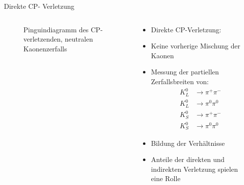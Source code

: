 \documentclass[aspectratio=1610, professionalfonts, 9pt, t]{beamer}
\begin{document}
\begin{frame}{Direkte CP- Verletzung}
\begin{columns}[onlytextwidth]
\begin{column}{0.4\textwidth}
\begin{figure}[ht]
          \caption{Pinguindiagramm des CP-verletzenden, neutralen Kaonenzerfalls}
        \end{figure}
      \end{column}
      \begin{column}{0.5\textwidth}
        \begin{itemize}
          \item Direkte CP-Verletzung:
          \item[\rightarrow] Keine vorherige Mischung der Kaonen
          \item Messung der partiellen Zerfallsbreiten von:
          \begin{align*}
            K_{L}^0 &\rightarrow \pi^+ \pi^- \\
            K_{L}^0 &\rightarrow \pi^0 \pi^0 \\
            K_{S}^0 &\rightarrow \pi^+ \pi^- \\
            K_{S}^0 &\rightarrow \pi^0 \pi^0
          \end{align*}
          \item Bildung der Verhältnisse
          \item[\rightarrow] Anteile der direkten und indirekten Verletzung spielen eine Rolle
        \end{itemize}
      \end{column}
    \end{columns}
  \end{frame}
\end{document}
